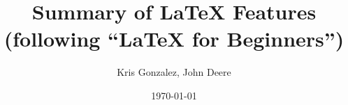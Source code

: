 \title{Summary of LaTeX Features \\
(following ``LaTeX for Beginners'')}
\author{Kris Gonzalez, John Deere} 
\date{\today} 
\maketitle
{} %


\newpage
\tableofcontents


\newpage